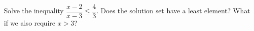 Solve the inequality $\dfrac{x-2}{x-3}\le\dfrac43$. Does the solution set have a least element? What if we also require $x>3$?
